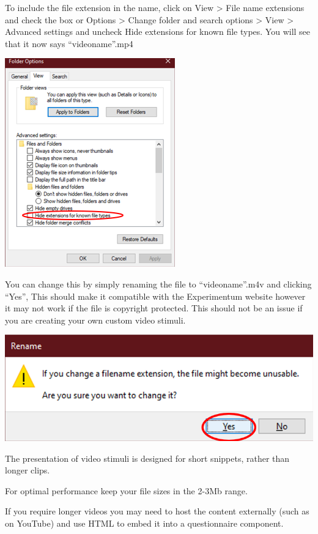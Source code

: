 \documentclass[]{book}
\begin{document}
To include the file extension in the name, click on View \textgreater{}
File name extensions and check the box or Options \textgreater{} Change
folder and search options \textgreater{} View \textgreater{} Advanced
settings and uncheck Hide extensions for known file types. You will see
that it now says ``videoname''.mp4

\includegraphics{images/screenshots/video_conv_2.png}

You can change this by simply renaming the file to ``videoname''.m4v and
clicking ``Yes'', This should make it compatible with the Experimentum
website however it may not work if the file is copyright protected. This
should not be an issue if you are creating your own custom video
stimuli.

\includegraphics{images/screenshots/video_conv_3.png}

\begin{warning}
The presentation of video stimuli is designed for short snippets, rather
than longer clips.

For optimal performance keep your file sizes in the 2-3Mb range.

If you require longer videos you may need to host the content externally
(such as on YouTube) and use HTML to embed it into a questionnaire
component.
\end{warning}
\end{document}
